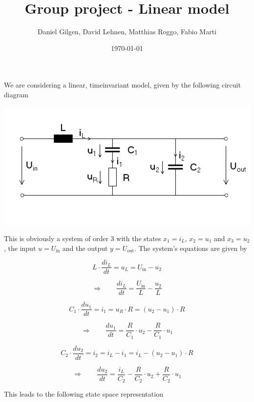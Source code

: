 \documentclass{article}
\title{Group project - Linear model}
\author{Daniel Gilgen, David Lehnen, Matthias Roggo, Fabio Marti}
\date{\today}
\begin{document}
\maketitle
\parindent 0pt
\linespread{1.2} \selectfont
{}
\parskip 10pt

We are considering a linear, timeinvariant model, given by the following circuit diagram

\begin{center}
\includegraphics[width=14cm]{circuit_diagram}
\end{center}


This is obviously a system of order 3 with the states \(x_1 = i_L\), \(x_2 = u_1\) and \(x_3 = u_2\), the input \(u = U_{\text{in}}\) and the output \(y = U_{\text{out}}\). The system's equations are given by

\[L \cdot \frac{d i_L}{dt} = u_L = U_{\text{in}}-u_2\]

\[\Longrightarrow \qquad \frac{d i_L}{dt} = \frac{U_{\text{in}}}{L} - \frac{u_2}{L}\]

\[C_1 \cdot \frac{d u_1}{dt} = i_1 = u_R \cdot R = (u_2 - u_1) \cdot R\]

\[\Longrightarrow \qquad \frac{d u_1}{dt} = \frac{R}{C_1} \cdot u_2 - \frac{R}{C_1} \cdot u_1\]

\[C_2 \cdot \frac{d u_2}{dt} = i_2 = i_L - i_1 = i_L - (u_2 - u_1) \cdot R\]

\[\Longrightarrow \qquad \frac{d u_2}{dt} = \frac{i_L}{C_2} - \frac{R}{C_2} \cdot u_2 + \frac{R}{C_2} \cdot u_1\]

This leads to the following state space representation
\end{document}
